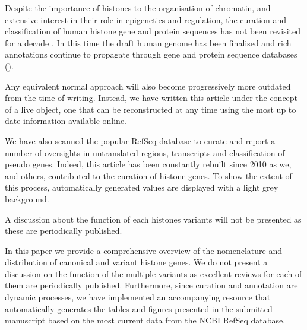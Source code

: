   Despite the importance of histones to the organisation of chromatin, and extensive interest
  in their role in epigenetics and regulation, the curation and classification of human histone
  gene and protein sequences has not been revisited for a decade \citep{Marzluff02}. In this time
  the draft human genome has been finalised and rich annotations continue to propagate through
  gene and protein sequence databases ().

  Any equivalent normal approach will also become progressively more outdated from the
  time of writing. Instead, we have written this article under the concept of a live
  object, one that can be reconstructed at any time using the most up to date information
  available online.

  We have also scanned the popular RefSeq
  database to curate and report a number of oversights in untranslated regions, transcripts and
  classification of pseudo genes. Indeed, this article has been constantly
  rebuilt since 2010 as we, and others, contributed to the curation of histone
  genes.  To show the extent of this process,
  automatically generated values are displayed with a light grey background.

  A discussion about the function of each histones variants will not be presented
  as these are periodically published.

  In this paper we provide a comprehensive overview of the nomenclature and distribution
  of canonical and variant histone genes. We do not present a discussion on the
  function of the multiple variants as excellent reviews for each of them are
  periodically published. Furthermore, since curation and annotation are
  dynamic processes, we have implemented an accompanying resource that automatically generates
  the tables and figures presented in the submitted manuscript based
  on the most current data from the NCBI RefSeq database.

